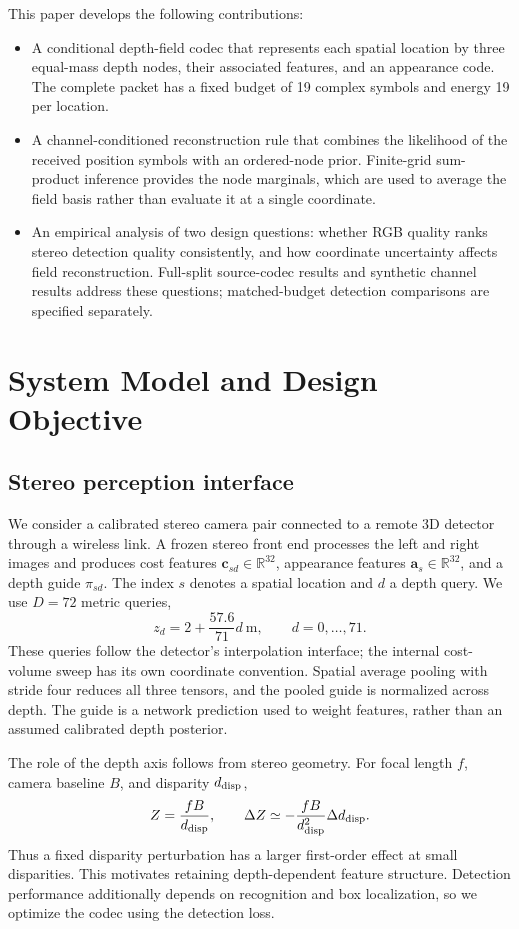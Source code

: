 \documentclass[conference]{IEEEtran}
\begin{document}
This paper develops the following contributions:
\begin{itemize}
\item A conditional depth-field codec that represents each spatial location
by three equal-mass depth nodes, their associated features, and an appearance
code. The complete packet has a fixed budget of 19 complex symbols and
energy 19 per location.
\item A channel-conditioned reconstruction rule that combines the likelihood
of the received position symbols with an ordered-node prior. Finite-grid
sum-product inference provides the node marginals, which are used to
average the field basis rather than evaluate it at a single coordinate.
\item An empirical analysis of two design questions: whether RGB quality
ranks stereo detection quality consistently, and how coordinate uncertainty
affects field reconstruction. Full-split source-codec results and synthetic
channel results address these questions; matched-budget detection comparisons
are specified separately.
\end{itemize}

\section{System Model and Design Objective}
\subsection{Stereo perception interface}
We consider a calibrated stereo camera pair connected to a remote 3D
detector through a wireless link. A frozen stereo front end processes the
left and right images and produces cost features
$\mathbf c_{sd}\in\mathbb R^{32}$, appearance features
$\mathbf a_s\in\mathbb R^{32}$, and a depth guide $\pi_{sd}$.
The index $s$ denotes a spatial location and $d$ a depth query. We use
$D=72$ metric queries,
\begin{equation}
 z_d=2+\frac{57.6}{71}d\ \mathrm{m},\qquad d=0,\ldots,71.
 \label{eq:queries}
\end{equation}
These queries follow the detector's interpolation interface; the internal
cost-volume sweep has its own coordinate convention. Spatial average
pooling with stride four reduces all three tensors, and the pooled guide
is normalized across depth. The guide is a network prediction used to
weight features, rather than an assumed calibrated depth posterior.

The role of the depth axis follows from stereo geometry. For focal length
$f$, camera baseline $B$, and disparity $d_{\rm disp}$,
\begin{equation}
 Z=\frac{fB}{d_{\rm disp}},\qquad
 \Delta Z\simeq-\frac{fB}{d_{\rm disp}^{2}}\Delta d_{\rm disp}.
 \label{eq:depth}
\end{equation}
Thus a fixed disparity perturbation has a larger first-order effect at
small disparities. This motivates retaining depth-dependent feature
structure. Detection performance additionally depends on recognition and
box localization, so we optimize the codec using the detection loss.
\end{document}
